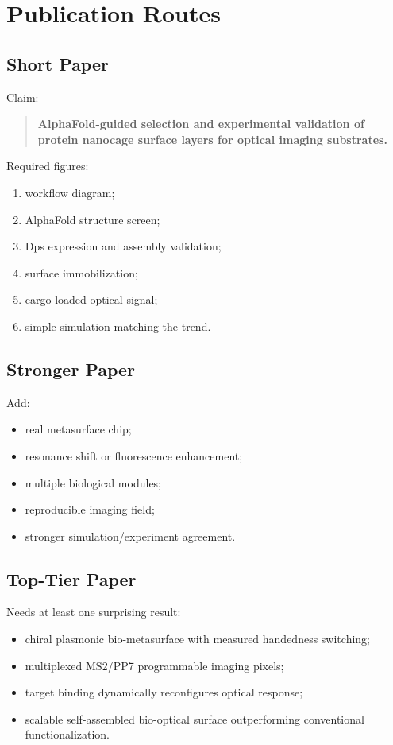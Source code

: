 \documentclass[11pt]{article}
\newcommand{\af}{AlphaFold}
\begin{document}
\section{Publication Routes}

\subsection{Short Paper}

Claim:

\begin{quote}
\textbf{\af{}-guided selection and experimental validation of protein nanocage surface layers for optical imaging substrates.}
\end{quote}

Required figures:

\begin{enumerate}
\item workflow diagram;
\item \af{} structure screen;
\item Dps expression and assembly validation;
\item surface immobilization;
\item cargo-loaded optical signal;
\item simple simulation matching the trend.
\end{enumerate}

\subsection{Stronger Paper}

Add:

\begin{itemize}
\item real metasurface chip;
\item resonance shift or fluorescence enhancement;
\item multiple biological modules;
\item reproducible imaging field;
\item stronger simulation/experiment agreement.
\end{itemize}

\subsection{Top-Tier Paper}

Needs at least one surprising result:

\begin{itemize}
\item chiral plasmonic bio-metasurface with measured handedness switching;
\item multiplexed MS2/PP7 programmable imaging pixels;
\item target binding dynamically reconfigures optical response;
\item scalable self-assembled bio-optical surface outperforming conventional functionalization.
\end{itemize}
\end{document}
